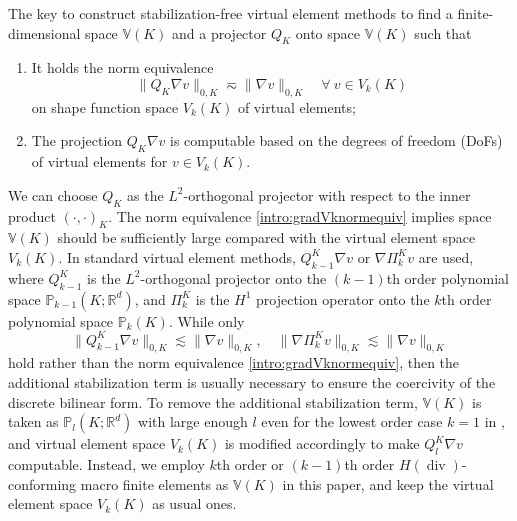 \documentclass[10pt]{amsart}
\renewcommand{\div}{\operatorname{div}}
\numberwithin{equation}{section}
\begin{document}
The key to construct stabilization-free virtual element methods to find a finite-dimensional space $\mathbb{V}(K)$ and a projector $Q_K$ onto space $\mathbb{V}(K)$ such that
\begin{enumerate}[(C1)]
\item It holds the norm equivalence 
\begin{equation}\label{intro:gradVknormequiv} 
\|Q_{K}\nabla v\|_{0,K}\eqsim \|\nabla v\|_{0,K} \quad \forall~v\in V_k(K)
\end{equation}
on shape function space $V_k(K)$ of virtual elements;
\item The projection $Q_{K}\nabla v$ is computable based on the degrees of freedom (DoFs) of virtual elements for $v\in V_k(K)$.
\end{enumerate}
We can choose $Q_{K}$ as the $L^2$-orthogonal projector with respect to the inner product $(\cdot, \cdot)_K$. The norm equivalence \eqref{intro:gradVknormequiv} implies space $\mathbb{V}(K)$ should be sufficiently large compared with the virtual element space $V_k(K)$.
In standard virtual element methods, $Q_{k-1}^{K}\nabla v$ \cite{BeiraodaVeigaBrezziMariniRusso2016} or $\nabla\Pi_k^{K}v$ \cite{BeiraoBrezziCangianiManziniEtAl2013,BeiraoBrezziMariniRusso2014,AhmadAlsaediBrezziMariniEtAl2013,AyusodeDiosLipnikovManzini2016} are used, where $Q_{k-1}^{K}$ is the $L^2$-orthogonal projector onto the $(k-1)$th order polynomial space $\mathbb P_{k-1}(K; \mathbb{R}^d)$, and $\Pi_k^{K}$ is the $H^1$ projection operator onto the $k$th order polynomial space $\mathbb P_{k}(K)$.
While only
$$
\|Q_{k-1}^{K}\nabla v\|_{0,K}\lesssim \|\nabla v\|_{0,K}, \quad \|\nabla\Pi_k^{K}v\|_{0,K}\lesssim \|\nabla v\|_{0,K}
$$
hold
rather than the norm equivalence \eqref{intro:gradVknormequiv}, then the additional stabilization term is usually necessary to ensure the coercivity of the discrete bilinear form.
To remove the additional stabilization term, $\mathbb{V}(K)$ is taken as $\mathbb P_{l}(K; \mathbb{R}^d)$ with large enough $l$ even for the lowest order case $k=1$ in \cite{BerroneBorioMarcon2021,BerroneBorioMarcon2022,DAltriMirandaPatrunoSacco2021}, and virtual element space $V_k(K)$ is modified accordingly to make $Q_{l}^{K}\nabla v$ computable.
Instead, we employ $k$th order or $(k-1)$th order $H(\div)$-conforming macro finite elements as $\mathbb{V}(K)$ in this paper, and keep the virtual element space $V_k(K)$ as usual ones.
\end{document}
